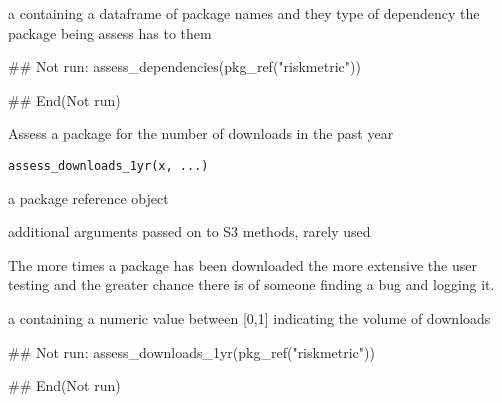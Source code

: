 \documentclass[a4paper]{book}
\begin{document}
%
\begin{Value}
a  containing a dataframe of package names and they type of dependency the package being assess has to them
\end{Value}
%
\begin{SeeAlso}
\end{SeeAlso}
%
\begin{Examples}
\begin{ExampleCode}
## Not run: 
assess_dependencies(pkg_ref("riskmetric"))

## End(Not run)
\end{ExampleCode}
\end{Examples}
%
\begin{Description}
Assess a package for the number of downloads in the past year
\end{Description}
%
\begin{Usage}
\begin{verbatim}
assess_downloads_1yr(x, ...)
\end{verbatim}
\end{Usage}
%
\begin{Arguments}
\begin{ldescription}
\item[\code{x}] a  package reference object

\item[\code{...}] additional arguments passed on to S3 methods, rarely used
\end{ldescription}
\end{Arguments}
%
\begin{Details}
The more times a package has been downloaded the more extensive the user testing and the greater chance there is of someone finding a bug and logging it.
\end{Details}
%
\begin{Value}
a  containing a numeric value between [0,1] indicating the volume of downloads
\end{Value}
%
\begin{SeeAlso}
\end{SeeAlso}
%
\begin{Examples}
\begin{ExampleCode}
## Not run: 
assess_downloads_1yr(pkg_ref("riskmetric"))

## End(Not run)
\end{ExampleCode}
\end{Examples}
\end{document}
